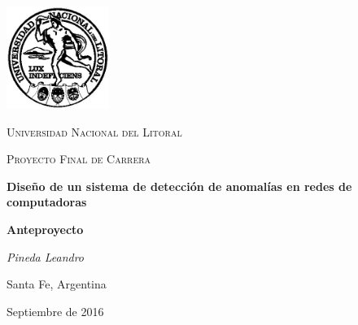 \documentclass[a4paper,12pt, oneside]{article}
\begin{document}
\begin{titlepage}
	\centering
	\includegraphics[width=0.25\textwidth]{Universidad_del_Litoral}\par\vspace{1cm}
	{\scshape\LARGE Universidad Nacional del Litoral \par}
	\vspace{1cm}
	{\scshape\Large Proyecto Final de Carrera\par}
	\vspace{1.5cm}
	{\huge\bfseries Diseño de un sistema de detección de anomalías en redes de computadoras\par}
	\vspace{4cm}
	{\huge\bfseries Anteproyecto\par}
	\vfill
		
	{\Large \itshape Pineda Leandro\par}
	
	\large Santa Fe, Argentina\par
	{Septiembre de 2016 \par}
	
\end{titlepage}






\newpage
 
\nocite{*}
\printbibliography
\end{document}
